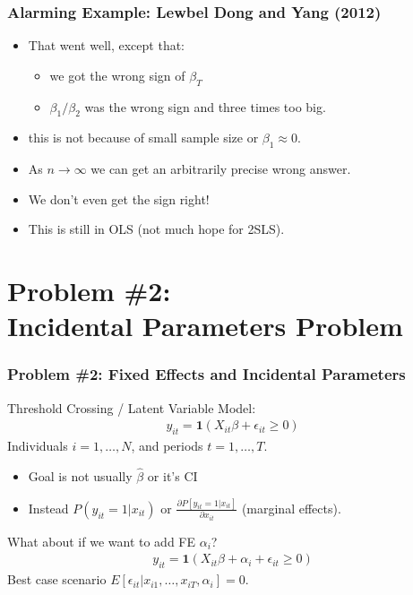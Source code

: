 \documentclass[xcolor=pdftex,dvipsnames,table,mathserif,aspectratio=169]{beamer}
\begin{document}
\begin{frame}[fragile]
\frametitle{Alarming Example: Lewbel Dong and Yang (2012)}
\begin{itemize}
\item That went well, except that:
\begin{itemize}
\item we got the wrong sign of $\beta_T$
\item $\beta_1/\beta_2$ was the wrong sign and three times too big.
\end{itemize}
\item this is not because of small sample size or $\beta_1 \approx 0$.
\item As $n \rightarrow \infty$ we can get an arbitrarily precise wrong answer.
\item We don't even get the sign right!
\item This is still in OLS (not much hope for 2SLS).
\end{itemize}
\tiny

\end{frame}


\section*{Problem \#2:\\
Incidental Parameters Problem}

\begin{frame}
\frametitle{Problem \#2: Fixed Effects and Incidental Parameters}
Threshold Crossing / Latent Variable Model:
\begin{eqnarray*}
y_{it} = \mathbf{1}(X_{it} \beta + \epsilon_{it} \geq 0)
\end{eqnarray*}
Individuals $i=1,\ldots,N$, and periods $t=1,\ldots,T$.
\begin{itemize}
\item  Goal is not usually $\hat{\beta}$ or it's CI
\item Instead  $P(y_{it}=1 | x_{it})$ or $\frac{\partial P[y_{it}=1 | x_{it}] }{\partial x_{it}}$ (marginal effects).
\end{itemize}
What about if we want to add FE $\alpha_i$?
\begin{eqnarray*}
y_{it} = \mathbf{1}(X_{it} \beta +\alpha_i+ \epsilon_{it} \geq 0)
\end{eqnarray*}
Best case scenario $E[\epsilon_{it} | x_{i1} ,\ldots, x_{iT}, \alpha_i]=0$.
\end{frame}
\end{document}
